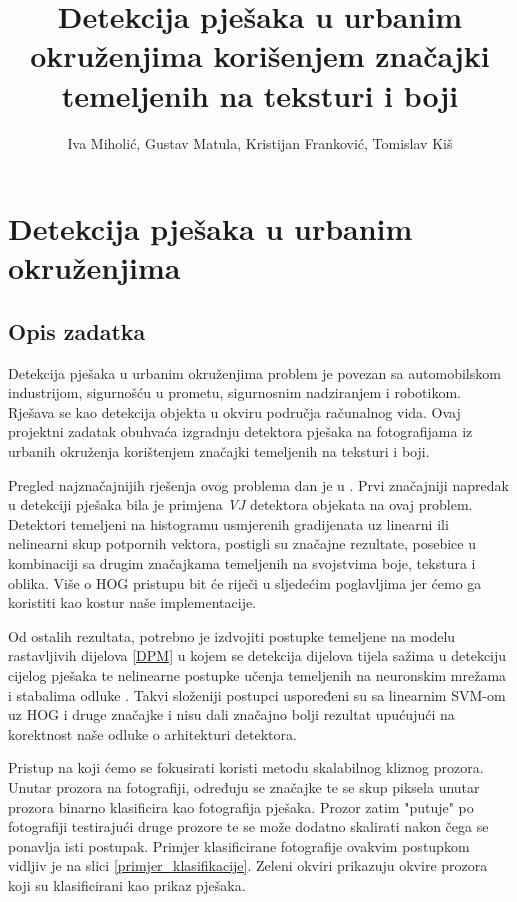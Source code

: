 \documentclass[seminar]{fer}
\title{Detekcija pješaka u urbanim okruženjima korišenjem značajki temeljenih na teksturi i boji}
\author{Iva Miholić, Gustav Matula, Kristijan Franković, Tomislav Kiš}
\begin{document}
\maketitle

\chapter{Detekcija pješaka u urbanim okruženjima}
\section{Opis zadatka}
Detekcija pješaka u urbanim okruženjima problem je povezan sa automobilskom industrijom, sigurnošću u prometu, sigurnosnim nadziranjem i robotikom. Rješava se kao detekcija objekta u okviru područja računalnog vida. Ovaj projektni zadatak obuhvaća izgradnju detektora pješaka na fotografijama iz urbanih okruženja korištenjem značajki temeljenih na teksturi i boji.

Pregled najznačajnijih rješenja ovog problema dan je u \cite{BenensonOHS14}. Prvi značajniji napredak u detekciji pješaka bila je primjena \emph{VJ} detektora objekata \cite{VJ} na ovaj problem. Detektori temeljeni na histogramu usmjerenih gradijenata  \cite{HOG}  uz linearni ili nelinearni skup potpornih vektora, postigli su značajne rezultate, posebice u kombinaciji sa drugim značajkama temeljenih na svojstvima boje, tekstura i oblika. Više o HOG pristupu bit će riječi u sljedećim poglavljima jer ćemo ga koristiti kao kostur naše implementacije.

Od ostalih rezultata, potrebno je izdvojiti postupke temeljene na modelu rastavljivih dijelova   \ref{DPM} u kojem se detekcija dijelova tijela sažima u detekciju cijelog pješaka te nelinearne postupke učenja temeljenih na neuronskim mrežama i stabalima odluke \cite{BenensonOHS14}. Takvi složeniji postupci uspoređeni su sa linearnim SVM-om uz HOG i druge značajke i nisu dali značajno bolji rezultat upućujući na korektnost naše odluke o arhitekturi detektora.

Pristup na koji ćemo se fokusirati koristi metodu skalabilnog kliznog prozora. Unutar prozora na fotografiji, određuju se značajke te se skup piksela unutar prozora binarno klasificira kao fotografija pješaka. Prozor zatim "putuje" po fotografiji testirajući druge prozore te se može dodatno skalirati nakon čega se ponavlja isti postupak. Primjer klasificirane fotografije ovakvim postupkom vidljiv je na slici \ref{primjer_klasifikacije}. Zeleni okviri prikazuju okvire prozora koji su klasificirani kao prikaz pješaka. 
\end{document}
